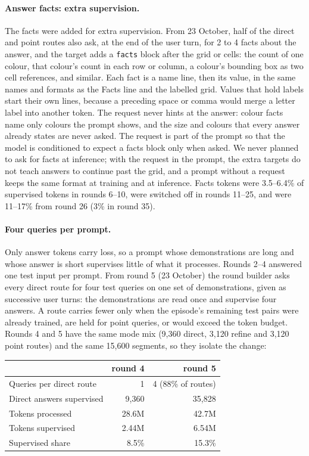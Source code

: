\documentclass[11pt]{article}
\begin{document}
\paragraph{Answer facts: extra supervision.} The facts were added for extra
supervision. From 23 October, half of the direct and point routes also ask, at
the end of the user turn, for 2 to 4 facts about the answer, and the target
adds a \texttt{facts} block after the grid or cells: the count of one colour,
that colour's count in each row or column, a colour's bounding box as two cell
references, and similar. Each fact is a name line, then its value, in the same
names and formats as the Facts line and the labelled grid. Values that hold
labels start their own lines, because a preceding space or comma would merge a
letter label into another token. The request never hints at the answer: colour
facts name only colours the prompt shows, and the size and colours that every
answer already states are never asked. The request is part of the prompt so
that the model is conditioned to expect a facts block only when asked. We never
planned to ask for facts at inference; with the request in the prompt, the extra
targets do not teach answers to continue past the grid, and a prompt without a
request keeps the same format at training and at inference. Facts tokens were
3.5--6.4\% of supervised tokens in rounds 6--10, were switched off in rounds
11--25, and were 11--17\% from round 26 (3\% in round 35).

\paragraph{Four queries per prompt.} Only answer tokens carry loss, so a prompt
whose demonstrations are long and whose answer is short supervises little of what
it processes. Rounds 2--4 answered one test input per prompt. From round 5
(23 October) the round builder asks every direct route for four test queries on
one set of demonstrations, given as successive user turns: the demonstrations are
read once and supervise four answers. A route carries fewer only when the
episode's remaining test pairs were already trained, are held for point queries,
or would exceed the token budget. Rounds 4 and 5 have the same mode mix (9,360
direct, 3,120 refine and 3,120 point routes) and the same 15,600 segments, so
they isolate the change:

\begin{center}
\begin{tabular}{lrr}
\toprule
& round 4 & round 5 \\
\midrule
Queries per direct route & 1 & 4 (88\% of routes) \\
Direct answers supervised & 9,360 & 35,828 \\
Tokens processed & 28.6M & 42.7M \\
Tokens supervised & 2.44M & 6.54M \\
Supervised share & 8.5\% & 15.3\% \\
\bottomrule
\end{tabular}
\end{center}
\end{document}
